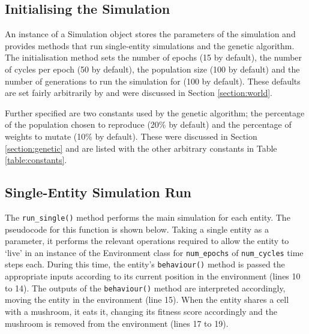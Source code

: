 \documentclass[12pt,a4paper,twoside,openright]{report}
\begin{document}
\subsection{Initialising the Simulation}\label{section:simulation-initialise}

An instance of a Simulation object stores the parameters of the simulation and provides methods that run single-entity simulations and the genetic algorithm. The initialisation method sets the number of epochs (15 by default), the number of cycles per epoch (50 by default), the population size (100 by default) and the number of generations to run the simulation for (100 by default). These defaults are set fairly arbitrarily by \citet{Cangelosi1998} and were discussed in Section \ref{section:world}.

Further specified are two constants used by the genetic algorithm; the percentage of the population chosen to reproduce (20\% by default) and the percentage of weights to mutate (10\% by default). These were discussed in Section \ref{section:genetic} and are listed with the other arbitrary constants in Table \ref{table:constants}.

\subsection{Single-Entity Simulation Run}\label{section:single-implementation}

The \texttt{run\_single()} method performs the main simulation for each entity. The pseudocode for this function is shown below. Taking a single entity as a parameter, it performs the relevant operations required to allow the entity to `live' in an instance of the Environment class for \texttt{num\_epochs} of \texttt{num\_cycles} time steps each. During this time, the entity's \texttt{behaviour()} method is passed the appropriate inputs according to its current position in the environment (lines 10 to 14). The outputs of the \texttt{behaviour()} method are interpreted accordingly, moving the entity in the environment (line 15). When the entity shares a cell with a mushroom, it eats it, changing its fitness score accordingly and the mushroom is removed from the environment (lines 17 to 19).
\end{document}
